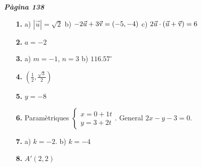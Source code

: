\documentclass[a4paper, pdf, twoside]{book}
\begin{document}
\begin{multicols}{2}
 

\vspace*{0.4cm}
 {}
\vspace{0.3cm}


{\textbf{\em Pàgina 138}} \hrulefill
\begin{enumerate}
\vspace{0.25cm}
\item[\fontfamily{phv}\selectfont\color{blue}\textbf{1. }]  \scalebox{0.6}{\simbolclau } 
a) $|\vec u|=\sqrt {2}$ b) $-2\vec u + 3\vec{\mathrm{v}} =(-5,-4)$ c) $2\vec u \cdot (\vec u + \vec{\mathrm{v}} )=6$
 \end{enumerate}
\begin{enumerate}
\vspace{0.25cm}
\item[\fontfamily{phv}\selectfont\color{blue}\textbf{2. }]  \scalebox{0.6}{\simbolclau } 
 $a=-2$
\vspace{0.25cm}
\item[\fontfamily{phv}\selectfont\color{blue}\textbf{3. }]  \scalebox{0.6}{\simbolclau } 
a) $m=-1$, $n=3$ b) $116.57^\circ $
\vspace{0.25cm}
\item[\fontfamily{phv}\selectfont\color{blue}\textbf{4. }]  \scalebox{0.6}{\simbolclau } 
$(\frac {1}{2}, \frac {\sqrt {3}}{2})$
\vspace{0.25cm}
\item[\fontfamily{phv}\selectfont\color{blue}\textbf{5. }]  \scalebox{0.6}{\simbolclau } 
$y=-8$
\vspace{0.25cm}
\item[\fontfamily{phv}\selectfont\color{blue}\textbf{6. }]  \scalebox{0.6}{\simbolclau } 
Paramètriques $\left \{\begin {array}{l} x=0+1t \\ y=3+2t \end {array}\right .$. General $2x-y-3=0$.
\vspace{0.25cm}
\item[\fontfamily{phv}\selectfont\color{blue}\textbf{7. }]  \scalebox{0.6}{\simbolclau } 
a) $k=-2$. b) $k=-4$
\vspace{0.25cm}
\item[\fontfamily{phv}\selectfont\color{blue}\textbf{8. }]  \scalebox{0.6}{\simbolclau } 
$A'(2,2)$
 \end{enumerate}
\vspace{0.3cm}


\end{multicols}
\end{document}
